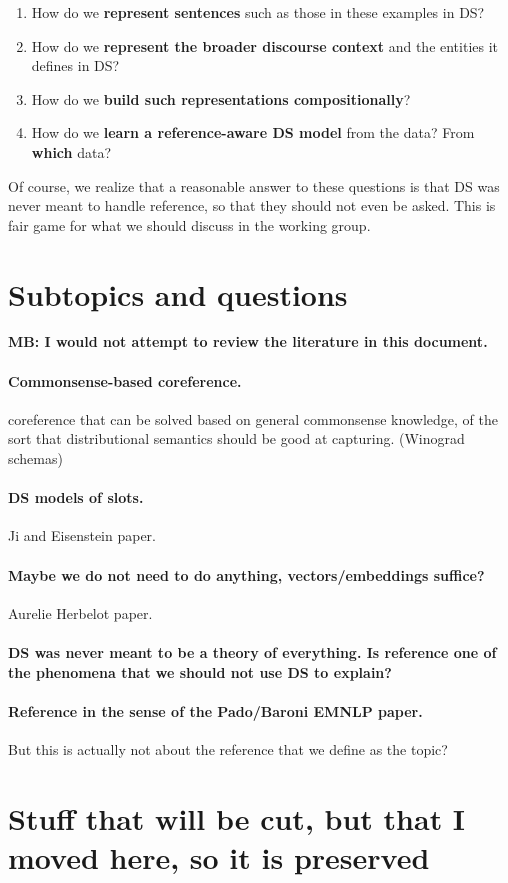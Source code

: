 \documentclass[a4paper,12pt]{article}
\begin{document}
\begin{enumerate}
\item How do we \textbf{represent sentences} such as those in these
  examples in DS?
\item How do we \textbf{represent the broader discourse context} and
  the entities it defines in DS?
\item How do we \textbf{build such representations compositionally}?
\item How do we \textbf{learn a reference-aware DS model} from the
  data? From \textbf{which} data?
\end{enumerate}

Of course, we realize that a reasonable answer to these questions is
that DS was never meant to handle reference, so that they should not
even be asked. This is fair game for what we should discuss in the
working group.


\section{Subtopics and questions}

\textbf{MB: I would not attempt to review the literature in this
  document.}

\paragraph{Commonsense-based coreference.}
coreference that can be solved based on general commonsense
knowledge, of the sort that distributional semantics should
be good at capturing.
(Winograd schemas)

\paragraph{DS models of slots.} Ji and Eisenstein paper.

\paragraph{Maybe we do not need to do anything,
  vectors/embeddings suffice?} Aurelie Herbelot paper.

\paragraph{DS was never meant to be a theory of
  everything. Is reference one of the phenomena that we
  should not use DS to explain?}

\paragraph{Reference in the sense of the Pado/Baroni EMNLP
  paper.} But this is actually not about the reference that
we define as the topic?


\section{Stuff that will be cut, but that I moved here, so
  it is preserved}



\end{document}
